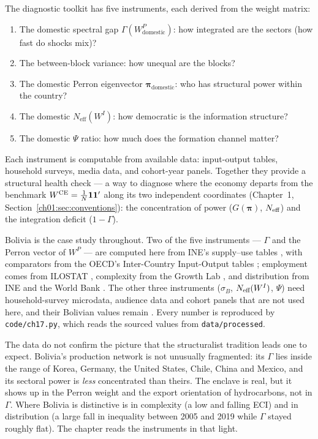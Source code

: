 \documentclass[../structural_economics_book.tex]{subfiles}
\begin{document}
The diagnostic toolkit has five instruments, each derived from the weight matrix:
\begin{enumerate}
\item The domestic spectral gap $\Gamma(W^P_{\text{domestic}})$: how integrated are the sectors (how fast do shocks mix)?
\item The between-block variance: how unequal are the blocks?
\item The domestic Perron eigenvector $\boldsymbol{\pi}_{\text{domestic}}$: who has structural power within the country?
\item The domestic $N_{\text{eff}}(W^I)$: how democratic is the information structure?
\item The domestic $\Psi$ ratio: how much does the formation channel matter?
\end{enumerate}

Each instrument is computable from available data: input-output tables, household surveys, media data, and cohort-year panels. Together they provide a structural health check --- a way to diagnose where the economy departs from the benchmark $W^{\text{CE}} = \frac{1}{N}\mathbf{1}\mathbf{1}'$ along its two independent coordinates (Chapter~1, Section~\ref{ch01:sec:conventions}): the concentration of power ($G(\boldsymbol{\pi})$, $N_{\text{eff}}$) and the integration deficit ($1 - \Gamma$).

Bolivia is the case study throughout. Two of the five instruments --- $\Gamma$ and the Perron vector of $W^P$ --- are computed here from INE's supply--use tables \citep{ine2026sut}, with comparators from the OECD's Inter-Country Input-Output tables \citep{oecd2023icio,oecd2021icio}; employment comes from ILOSTAT \citep{ilo2026ilostat}, complexity from the Growth Lab \citep{growthlab2026atlas}, and distribution from INE and the World Bank \citep{worldbank2026wdi}. The other three instruments ($\sigma_B$, $N_{\text{eff}}(W^I)$, $\Psi$) need household-survey microdata, audience data and cohort panels that are not used here, and their Bolivian values remain \illustrative. Every number is reproduced by \texttt{code/ch17.py}, which reads the sourced values from \texttt{data/processed}.

The data do not confirm the picture that the structuralist tradition leads one to expect. Bolivia's production network is not unusually fragmented: its $\Gamma$ lies inside the range of Korea, Germany, the United States, Chile, China and Mexico, and its sectoral power is \emph{less} concentrated than theirs. The enclave is real, but it shows up in the Perron weight and the export orientation of hydrocarbons, not in $\Gamma$. Where Bolivia is distinctive is in complexity (a low and falling ECI) and in distribution (a large fall in inequality between 2005 and 2019 while $\Gamma$ stayed roughly flat). The chapter reads the instruments in that light.
\end{document}
